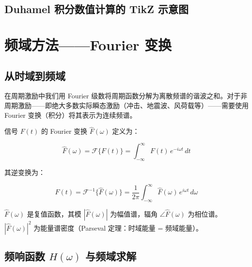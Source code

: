 \subsection{Duhamel 积分数值计算的 TikZ 示意图}


\section{频域方法——Fourier 变换}

\subsection{从时域到频域}

在周期激励中我们用 Fourier 级数将周期函数分解为离散频谱的谐波之和。对于非周期激励——即绝大多数实际瞬态激励（冲击、地震波、风荷载等）——需要使用 Fourier 变换（积分）将其表示为连续频谱。

信号 $F(t)$ 的 Fourier 变换 $\hat{F}(\omega)$ 定义为：

\begin{myformula}
\[
\hat{F}(\omega) = \mathcal{F}\{F(t)\} = \int_{-\infty}^{\infty} F(t)\, e^{-i\omega t}\,dt
\]
\end{myformula}

其逆变换为：

\begin{myformula}
\[
F(t) = \mathcal{F}^{-1}\{\hat{F}(\omega)\} = \frac{1}{2\pi} \int_{-\infty}^{\infty} \hat{F}(\omega)\, e^{i\omega t}\,d\omega
\]
\end{myformula}

$\hat{F}(\omega)$ 是复值函数，其模 $|\hat{F}(\omega)|$ 为幅值谱，辐角 $\angle\hat{F}(\omega)$ 为相位谱。$|\hat{F}(\omega)|^2$ 为能量谱密度（Parseval 定理：时域能量 = 频域能量）。

\subsection{频响函数 $H(\omega)$ 与频域求解}

